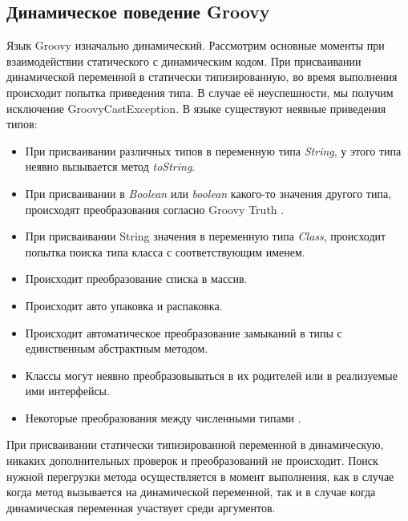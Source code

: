\subsection{Динамическое поведение Groovy}

Язык Groovy изначально динамический. Рассмотрим основные моменты при взаимодействии статического с динамическим кодом. При присваивании динамической переменной в статически типизированную, во время выполнения происходит попытка приведения типа. В случае её неуспешности, мы получим исключение GroovyCastException. В языке существуют неявные приведения типов:

\begin{itemize}
\item При присваивании различных типов в переменную типа \textit{String}, у этого типа неявно вызывается метод \textit{toString}. 
\item При присваивании в \textit{Boolean} или \textit{boolean} какого-то значения другого типа, происходят преобразования согласно Groovy Truth \cite{groovy:groovyTruth}.
\item При присваивании String значения в переменную типа \textit{Class}, происходит попытка поиска типа класса с соответствующим именем. 
\item Происходит преобразование списка в массив. 
\item Происходит авто упаковка и распаковка.
\item Происходит автоматическое преобразование замыканий в типы с единственным абстрактным методом.
\item Классы могут неявно преобразовываться в их родителей или в реализуемые ими интерфейсы.
\item Некоторые преобразования между численными типами \cite{groovy:semanticTypeCheckingAssignments}. 
\end{itemize}
При присваивании статически типизированной переменной в динамическую, никаких дополнительных проверок и преобразований не происходит.
Поиск нужной перегрузки метода осуществляется в момент выполнения, как в случае когда метод вызывается на динамической переменной, так и в случае когда динамическая переменная участвует среди аргументов.




